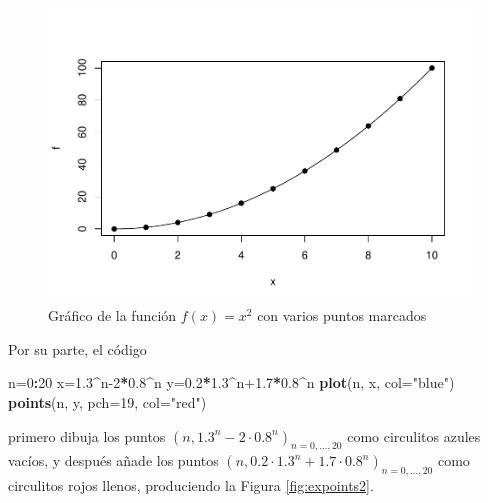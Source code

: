 \documentclass[
]{book}
\newenvironment{Shaded}{\begin{snugshade}}{\end{snugshade}}
\newcommand{\DataTypeTok}[1]{\textcolor[rgb]{0.13,0.29,0.53}{#1}}
\newcommand{\DecValTok}[1]{\textcolor[rgb]{0.00,0.00,0.81}{#1}}
\newcommand{\FloatTok}[1]{\textcolor[rgb]{0.00,0.00,0.81}{#1}}
\newcommand{\KeywordTok}[1]{\textcolor[rgb]{0.13,0.29,0.53}{\textbf{#1}}}
\newcommand{\NormalTok}[1]{#1}
\newcommand{\OperatorTok}[1]{\textcolor[rgb]{0.81,0.36,0.00}{\textbf{#1}}}
\newcommand{\StringTok}[1]{\textcolor[rgb]{0.31,0.60,0.02}{#1}}
\theoremstyle{definition}
\theoremstyle{definition}
\theoremstyle{definition}
\theoremstyle{remark}
\begin{document}
\begin{figure}

{\centering \includegraphics[width=0.9\linewidth]{07chap06_Graficos_I_files/figure-latex/expoints1-1} 

}

\caption{Gráfico de la función $f(x)=x^2$ con varios puntos marcados}\label{fig:expoints1}
\end{figure}

Por su parte, el código

\begin{Shaded}
\begin{Highlighting}[]
\NormalTok{n=}\DecValTok{0}\OperatorTok{:}\DecValTok{20}
\NormalTok{x=}\FloatTok{1.3}\OperatorTok{\^{}}\NormalTok{n}\DecValTok{{-}2}\OperatorTok{*}\FloatTok{0.8}\OperatorTok{\^{}}\NormalTok{n}
\NormalTok{y=}\FloatTok{0.2}\OperatorTok{*}\FloatTok{1.3}\OperatorTok{\^{}}\NormalTok{n}\FloatTok{+1.7}\OperatorTok{*}\FloatTok{0.8}\OperatorTok{\^{}}\NormalTok{n}
\KeywordTok{plot}\NormalTok{(n, x, }\DataTypeTok{col=}\StringTok{"blue"}\NormalTok{)}
\KeywordTok{points}\NormalTok{(n, y, }\DataTypeTok{pch=}\DecValTok{19}\NormalTok{, }\DataTypeTok{col=}\StringTok{"red"}\NormalTok{)}
\end{Highlighting}
\end{Shaded}

primero dibuja los puntos \((n, 1.3^n-2\cdot 0.8^n)_{n=0, \ldots, 20}\) como circulitos azules vacíos, y después añade los puntos \((n, 0.2\cdot 1.3^n+1.7 \cdot 0.8^n)_{n=0, \ldots, 20}\) como circulitos rojos llenos, produciendo la Figura \ref{fig:expoints2}.
\end{document}
